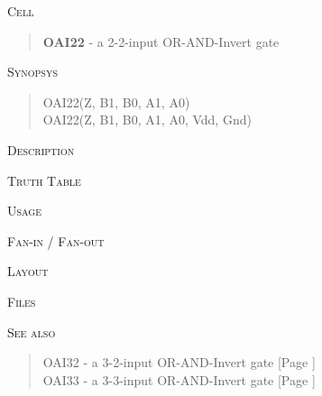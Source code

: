
\label{OAI22}
\textsc{Cell}
\begin{quote}
    \textbf{OAI22} - a 2-2-input OR-AND-Invert gate
\end{quote}

\textsc{Synopsys}
\begin{quote}
    OAI22(Z, B1, B0, A1, A0) \\
    OAI22(Z, B1, B0, A1, A0, Vdd, Gnd)
\end{quote}

\textsc{Description}

%

\textsc{Truth Table}


\textsc{Usage}

\textsc{Fan-in / Fan-out}

\textsc{Layout}

\textsc{Files}

\textsc{See also}
\begin{quote}
    OAI32 - a 3-2-input OR-AND-Invert gate [Page \pageref{OAI32}] \\
    OAI33 - a 3-3-input OR-AND-Invert gate [Page \pageref{OAI33}]
\end{quote}
